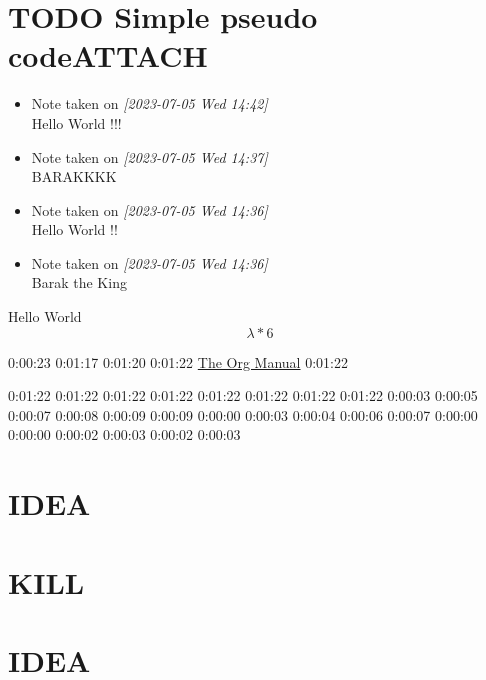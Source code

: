 \documentclass[9pt,twocolumn]{article}
\begin{document}
\section*{{\bfseries\sffamily TODO} Simple pseudo code\hfill{}\textsc{ATTACH}}
\label{sec:orgb6dd3db}
\begin{itemize}
\item Note taken on \textit{[2023-07-05 Wed 14:42] } \\[0pt]
Hello World !!!
\item Note taken on \textit{[2023-07-05 Wed 14:37] } \\[0pt]
BARAKKKK
\item Note taken on \textit{[2023-07-05 Wed 14:36] } \\[0pt]
Hello World !!
\item Note taken on \textit{[2023-07-05 Wed 14:36] } \\[0pt]
Barak the King
\end{itemize}
Hello World
\begin{displaymath}
\lambda *6
\end{displaymath}

0:00:23
0:01:17
0:01:20
0:01:22
\href{https://orgmode.org/org.html\#Tables-in-LaTeX-export}{The Org Manual}
0:01:22

0:01:22
0:01:22
0:01:22
0:01:22 0:01:22 0:01:22 0:01:22 0:01:22
0:00:03 0:00:05 0:00:07 0:00:08 0:00:09 0:00:09 0:00:00 0:00:03 0:00:04
0:00:06 0:00:07 0:00:00 0:00:00 0:00:02 0:00:03 0:00:02 0:00:03
\section*{IDEA}
\label{sec:org01d2539}
\section*{KILL}
\label{sec:org1cca3f2}
\section*{IDEA}
\label{sec:org48a7acb}
\end{document}
